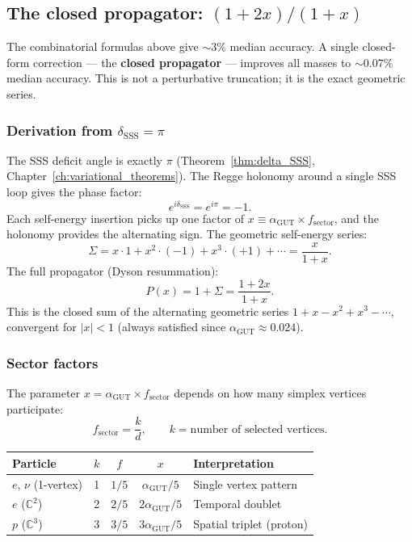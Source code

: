 \documentclass[12pt]{article}
\theoremstyle{remark}
\theoremstyle{definition}
\newcommand{\CC}{\mathbb{C}}
\newcommand{\agut}{\alpha_{\mathrm{GUT}}}
\begin{document}
\subsection{The closed propagator: $(1+2x)/(1+x)$}
\label{sec:closed_propagator}

The combinatorial formulas above give $\sim 3\%$ median accuracy.  A single closed-form correction --- the \textbf{closed propagator} --- improves all masses to $\sim 0.07\%$ median accuracy.  This is not a perturbative truncation; it is the exact geometric series.

\subsubsection{Derivation from $\delta_\mathrm{SSS} = \pi$}

The SSS deficit angle is exactly $\pi$ (Theorem~\ref{thm:delta_SSS}, Chapter~\ref{ch:variational_theorems}).  The Regge holonomy around a single SSS loop gives the phase factor:
\begin{equation}
e^{i\delta_\mathrm{SSS}} = e^{i\pi} = -1.
\end{equation}
Each self-energy insertion picks up one factor of $x \equiv \agut \times f_\mathrm{sector}$, and the holonomy provides the alternating sign.  The geometric self-energy series:
\begin{equation}
\Sigma = x \cdot 1 + x^2 \cdot (-1) + x^3 \cdot (+1) + \cdots = \frac{x}{1 + x}.
\end{equation}
The full propagator (Dyson resummation):
\begin{equation}
\label{eq:closed_propagator}
\boxed{P(x) = 1 + \Sigma = \frac{1 + 2x}{1 + x}.}
\end{equation}
This is the closed sum of the alternating geometric series $1 + x - x^2 + x^3 - \cdots$, convergent for $|x| < 1$ (always satisfied since $\agut \approx 0.024$).

\subsubsection{Sector factors}

The parameter $x = \agut \times f_\mathrm{sector}$ depends on how many simplex vertices participate:
\begin{equation}
f_\mathrm{sector} = \frac{k}{d}, \qquad k = \text{number of selected vertices.}
\end{equation}
\begin{center}
\begin{tabular}{lcccl}
\hline
Particle & $k$ & $f$ & $x$ & Interpretation \\
\hline
$e$, $\nu$ (1-vertex) & 1 & $1/5$ & $\agut/5$ & Single vertex pattern \\
$e$ ($\CC^2$) & 2 & $2/5$ & $2\agut/5$ & Temporal doublet \\
$p$ ($\CC^3$) & 3 & $3/5$ & $3\agut/5$ & Spatial triplet (proton) \\
\hline
\end{tabular}
\end{center}
\end{document}
